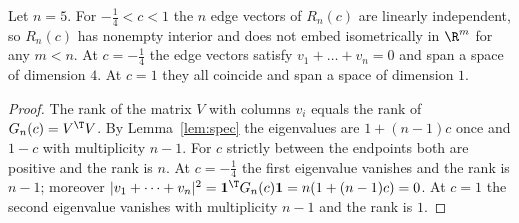 \begin{theorem}\label{thm:main}
Let $n=5$. For $- \frac{1}{4}<c<1$ the $n$ edge vectors of $R_n(c)$ are linearly independent, so $R_n(c)$ has nonempty interior and does not embed isometrically in $\R^m$ for any $m<n$.
At $c=- \frac{1}{4}$ the edge vectors satisfy $v_1+\dots+v_n=0$ and span a space of dimension $4$.
At $c=1$ they all coincide and span a space of dimension $1$.
\end{theorem}
\begin{proof}
The rank of the matrix $V$ with columns $v_i$ equals the rank of $G_n(c)=V^\T V$.
By Lemma~\ref{lem:spec} the eigenvalues are $1+(n-1)c$ once and $1-c$ with multiplicity $n-1$.
For $c$ strictly between the endpoints both are positive and the rank is $n$.
At $c=- \frac{1}{4}$ the first eigenvalue vanishes and the rank is $n-1$; moreover $|v_1+\dots+v_n|^2=\mathbf 1^\T G_n(c)\mathbf 1=n(1+(n-1)c)=0$.
At $c=1$ the second eigenvalue vanishes with multiplicity $n-1$ and the rank is $1$.
\end{proof}
